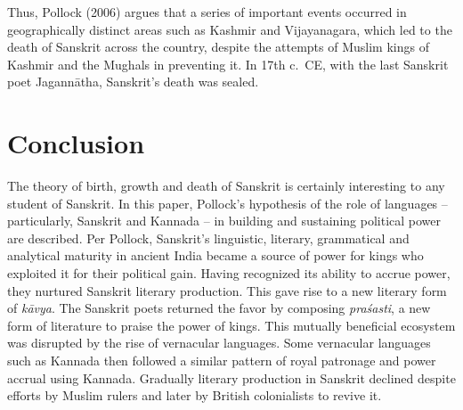 Thus, Pollock (2006) argues that a series of important events occurred in geographically distinct areas such as Kashmir and Vijayanagara, which led to the death of Sanskrit across the country, despite the attempts of Muslim kings of Kashmir and the Mughals in preventing it. In 17th c.\ CE, with the last Sanskrit poet Jagannātha, Sanskrit’s death was sealed.

\section{Conclusion}

The theory of birth, growth and death of Sanskrit is certainly interesting to any student of Sanskrit. In this paper, Pollock’s hypothesis of the role of languages – particularly, Sanskrit and Kannada – in building and sustaining political power are described. Per Pollock, Sanskrit’s linguistic, literary, grammatical and analytical maturity in ancient India became a source of power for kings who exploited it for their political gain. Having recognized its ability to accrue power, they nurtured Sanskrit literary production. This gave rise to a new literary form of {\sl kāvya}. The Sanskrit poets returned the favor by composing {\sl praśasti}, a new form of literature to praise the power of kings. This mutually beneficial ecosystem was disrupted by the rise of vernacular languages. Some vernacular languages such as Kannada then followed a similar pattern of royal patronage and power accrual using Kannada. Gradually literary production in Sanskrit declined despite efforts by Muslim rulers and later by British colonialists to revive it. 

